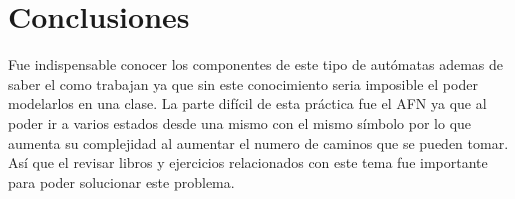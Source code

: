 \documentclass[titlepage]{article}
\begin{document}
	\section{Conclusiones}
	Fue indispensable conocer los componentes de este tipo de autómatas ademas de saber el como trabajan 
	ya que sin este conocimiento seria imposible el poder modelarlos en una clase. La parte difícil de esta 
	práctica fue el AFN ya que al poder ir a varios estados desde una mismo con el mismo símbolo por lo que 
	aumenta su complejidad al aumentar el numero de caminos que se pueden tomar. 
	Así que el revisar libros y ejercicios relacionados con este tema fue importante para poder solucionar este problema.
	 
	
\end{document}
